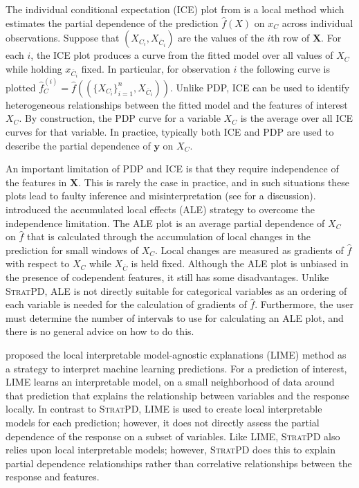 \documentclass[12pt]{article}
\newcommand{\spd}{\fontfamily{cmr}\textsc{\small StratPD}}
\begin{document}
The individual conditional expectation (ICE) plot from \cite{ICE} is a local method which estimates the partial dependence of the prediction $\widehat{f}({X})$ on $x_C$ across individual observations. Suppose that $(X_{C_i}, X_{\overline{C}_i})$ are the values of the $i$th row of $\mathbf{X}$. For each $i$, the ICE plot produces a curve from the fitted model over all values of $X_C$ while holding $x_{\overline{C}_i}$ fixed. In particular, for observation $i$ the following curve is plotted $\widehat{f}^{(i)}_C = \widehat{f}((\{X_{C_i}\}_{i = 1}^n, X_{\overline{C}_i}))$. Unlike PDP, ICE can be used to  identify heterogeneous relationships between the fitted model and the features of interest $X_C$. By construction, the PDP curve for a variable $X_C$ is the average over all ICE curves for that variable. In practice, typically both ICE and PDP are used to describe the partial dependence of $\mathbf{y}$ on $X_C$.

An important limitation of PDP and ICE is that they require independence of the features in $\mathbf{X}$. This is rarely the case in practice, and in such situations these plots lead to faulty inference and misinterpretation (see \cite{apley2016visualizing} for a discussion). \cite{apley2016visualizing} introduced the accumulated local effects (ALE) strategy to overcome the independence limitation. The ALE plot is an average partial dependence of $X_C$ on $\widehat{f}$ that is calculated through the accumulation of local changes in the prediction for small windows of $X_C$. Local changes are measured as gradients of $\widehat{f}$ with respect to $X_C$ while $X_{\overline{C}}$ is held fixed. Although the ALE plot is unbiased in the presence of codependent features, it still has some disadvantages. Unlike \spd{}, ALE is not directly suitable for categorical variables as an ordering of each variable is needed for the calculation of gradients of $\widehat{f}$. Furthermore, the user must determine the number of intervals to use for calculating an ALE plot, and there is no general advice on how to do this.

\cite{ribeiro2016should} proposed the local interpretable model-agnostic explanations (LIME) method as a strategy to interpret machine learning predictions. For a prediction of interest, LIME learns an interpretable model, on a small neighborhood of data around that prediction that explains the relationship between variables and the response locally. In contrast to \spd{}, LIME is used to create local interpretable models for each prediction; however, it does not directly assess the partial dependence of the response on a subset of variables. Like LIME, \spd{} also relies upon local interpretable models; however, \spd{} does this to explain partial dependence relationships rather than correlative relationships between the response and features. 
\end{document}
